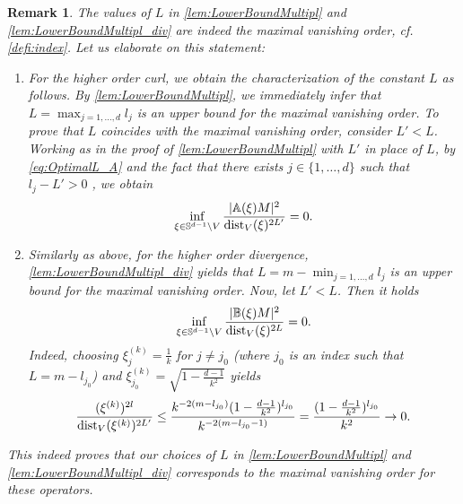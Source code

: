 \documentclass[a4paper, 10pt, twoside, notitlepage]{amsart}
\theoremstyle{plain}
\newtheorem{rmk}[prop]{Remark}
\renewcommand{\AA}{\mathbb{A}}
\begin{document}
		 
			\begin{rmk}
			\label{rmk:opt}
				The values of $L$ in \cref{lem:LowerBoundMultipl} and \cref{lem:LowerBoundMultipl_div} are indeed the maximal vanishing order, cf. \cref{defi:index}.  Let us elaborate on this statement:
                                \renewcommand{\labelenumi}{\textbf{\theenumi}} \renewcommand{\theenumi}{(\roman{enumi})}
				\begin{enumerate}
                                \item For the higher order curl, we obtain the characterization of the constant $L$ as follows. By \cref{lem:LowerBoundMultipl}, we immediately infer that $L = \max_{j=1,\dots,d} l_j$ is an upper bound for the maximal vanishing order. To prove that $L$ coincides with the maximal vanishing order, consider $L' < L$. Working as in the proof of \cref{lem:LowerBoundMultipl} with $L'$ in place of $L$, by \eqref{eq:OptimalL_A} and the fact that there exists $j \in \{1,\dots,d\}$ such that $l_j -L' > 0$ , we obtain
                                    \begin{align*}
                                      \inf_{\xi \in \mathbb{S}^{d-1} \setminus V} \frac{|\AA(\xi)M|^2}{\dist_V(\xi)^{2L'}} = 0.
                                    \end{align*}
                                \item Similarly as above, for the higher order divergence, \cref{lem:LowerBoundMultipl_div} yields that $L = m - \min_{j=1,\dots,d}l_j$ is an upper bound for the maximal vanishing order.
                                  Now, let
                                  $L' < L$. Then it holds
					\begin{align*}
						\inf_{\xi \in \mathbb{S}^{d-1} \setminus V} \frac{|\mathbb{B}(\xi)M|^2}{\operatorname{dist}_V(\xi)^{2L}} = 0.
					\end{align*}
					Indeed, choosing $\xi^{(k)}_j = \frac{1}{k}$ for $j \neq j_0$ (where $j_0$ is an index such that $L = m - l_{j_0}$) and $\xi^{(k)}_{j_0} = \sqrt{1-\frac{d-1}{k^2}}$ yields
					\begin{align*}
						\frac{(\xi^{(k)})^{2l}}{\operatorname{dist}_V(\xi^{(k)})^{2L'}} \leq \frac{k^{-2(m-l_{j_0})}(1-\frac{d-1}{k^2})^{l_{j_0}}}{k^{-2(m-l_{j_0}-1)}} = \frac{(1-\frac{d-1}{k^2})^{l_{j_0}}}{k^2} \to 0.
					\end{align*}
				\end{enumerate}
				This indeed proves that our choices of $L$ in \cref{lem:LowerBoundMultipl} and \cref{lem:LowerBoundMultipl_div} corresponds to the maximal vanishing order for these operators.
			\end{rmk}
		
\end{document}
